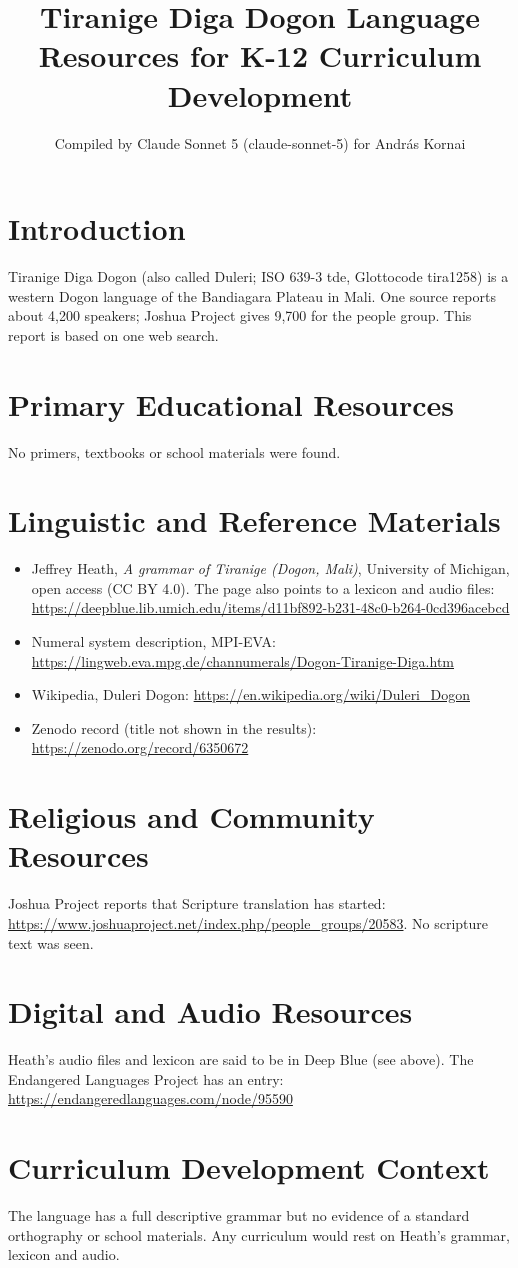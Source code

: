 \documentclass[12pt]{article}
\title{Tiranige Diga Dogon Language Resources for K-12 Curriculum Development}
\author{Compiled by Claude Sonnet 5 (claude-sonnet-5) for Andr\'as Kornai}
\date{}
\begin{document}
\maketitle
\section{Introduction}
Tiranige Diga Dogon (also called Duleri; ISO 639-3 tde, Glottocode tira1258) is a western Dogon language of the Bandiagara Plateau in Mali. One source reports about 4,200 speakers; Joshua Project gives 9,700 for the people group. This report is based on one web search.
\section{Primary Educational Resources}
No primers, textbooks or school materials were found.
\section{Linguistic and Reference Materials}
\begin{itemize}
\item Jeffrey Heath, \emph{A grammar of Tiranige (Dogon, Mali)}, University of Michigan, open access (CC BY 4.0). The page also points to a lexicon and audio files: \url{https://deepblue.lib.umich.edu/items/d11bf892-b231-48c0-b264-0cd396acebcd}
\item Numeral system description, MPI-EVA: \url{https://lingweb.eva.mpg.de/channumerals/Dogon-Tiranige-Diga.htm}
\item Wikipedia, Duleri Dogon: \url{https://en.wikipedia.org/wiki/Duleri_Dogon}
\item Zenodo record (title not shown in the results): \url{https://zenodo.org/record/6350672}
\end{itemize}
\section{Religious and Community Resources}
Joshua Project reports that Scripture translation has started: \url{https://www.joshuaproject.net/index.php/people_groups/20583}. No scripture text was seen.
\section{Digital and Audio Resources}
Heath's audio files and lexicon are said to be in Deep Blue (see above). The Endangered Languages Project has an entry: \url{https://endangeredlanguages.com/node/95590}
\section{Curriculum Development Context}
The language has a full descriptive grammar but no evidence of a standard orthography or school materials. Any curriculum would rest on Heath's grammar, lexicon and audio.
\end{document}
